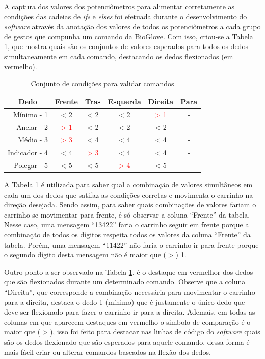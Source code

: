 \documentclass[
	12pt,				%
	openright,			%
	oneside,			%
	a4paper,			%
	english,			%
	brazil				%
	]{abntex2}
\begin{document}
		A captura dos valores dos potenciômetros para alimentar corretamente as condições das cadeias de \textit{ifs} e \textit{elses} foi efetuada durante o desenvolvimento do \textit{software} através da anotação dos valores de todos os potenciômetros a cada grupo de gestos que compunha um comando da BioGlove. Com isso, criou-se a Tabela \ref{Tab:dedos-e-comandos1}, que mostra quais são os conjuntos de valores esperados para todos os dedos simultaneamente em cada comando, destacando os dedos flexionados (em vermelho). 
		
\begin{table}[H]
	\centering
  \caption{Conjunto de condições para validar comandos}
  \begin{tabular}{r|ccccc}
		\midrule
\multicolumn{1}{c|}{Dedo} 					&       Frente			 & 				Tras				& 		Esquerda			 & 		Direita					& Para	\\
			 \midrule
			 Mínimo - 1    		& < 2   						 & < 2   							& < 2    						 &\textcolor{red}{> 1}&	-			\\
			 Anelar - 2    		&\textcolor{red}{> 1}& < 2   							& < 2  	 						 & < 2   							&	-			\\
			 Médio - 3    		&\textcolor{red}{> 3}& < 4   							& < 4   						 & < 4   							&	-			\\
			 Indicador - 4    & < 4   						 &\textcolor{red}{> 3}& < 4 							 & < 4   							&	-			\\
			 Polegar - 5    	& < 5   						 & < 5   							&\textcolor{red}{> 4}& < 5   							&	-			\\
		 \midrule
	\end{tabular}
  \label{Tab:dedos-e-comandos1}
  \end{table}

		A Tabela \ref{Tab:dedos-e-comandos1} é utilizada para saber qual a combinação de valores simultâneos em cada um dos dedos que satifaz as condições corretas e movimenta o carrinho na direção desejada. Sendo assim, para saber quais combinações de valores fariam o carrinho se movimentar para frente, é só observar a coluna ``Frente'' da tabela. Nesse caso, uma mensagem ``13422'' faria o carrinho seguir em frente porque a combinação de todos os dígitos respeita todos os valores da coluna ``Frente'' da tabela. Porém, uma mensagem ``11422'' não faria o carrinho ir para frente porque o segundo dígito desta mensagem não é maior que ($>$) 1.

		Outro ponto a ser observado na Tabela \ref{Tab:dedos-e-comandos1}, é o destaque em vermelhor dos dedos que são flexionados durante um determinado comando. Observe que a coluna ``Direita'', que corresponde a combinação necessária para movimentar o carrinho para a direita, destaca o dedo 1 (mínimo) que é justamente o único dedo que deve ser flexionado para fazer o carrinho ir para a direita. Ademais, em todas as colunas em que aparecem destaques em vermelho o simbolo de comparação é o maior que ($>$), isso foi feito para destacar nas linhas de código do \textit{software} quais são os dedos flexionado que são esperados para aquele comando, dessa forma é mais fácil criar ou alterar comandos baseados na flexão dos dedos.
\end{document}
